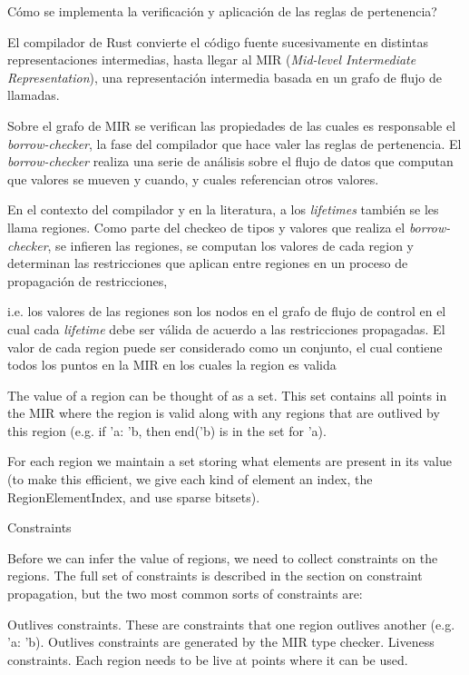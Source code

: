\documentclass[11pt, a4paper]{article}
\begin{document}
Cómo se implementa la verificación y aplicación de las reglas de pertenencia?

El compilador de Rust convierte el código fuente sucesivamente en distintas representaciones intermedias, hasta llegar al MIR (\textit{Mid-level Intermediate Representation}), una representación intermedia basada en un grafo de flujo de llamadas.

Sobre el grafo de MIR se verifican las propiedades de las cuales es responsable el \textit{borrow-checker}, la fase del compilador que hace valer las reglas de pertenencia.
El \textit{borrow-checker} realiza una serie de análisis sobre el flujo de datos que computan que valores se mueven y cuando, y cuales referencian otros valores.

En el contexto del compilador y en la literatura, a los \textit{lifetimes} también se les llama regiones.
Como parte del checkeo de tipos y valores que realiza el \textit{borrow-checker}, se infieren las regiones, se computan los valores de cada region y determinan las restricciones que aplican entre regiones en un proceso de propagación de restricciones,

i.e. los valores de las regiones son los nodos en el grafo de flujo de control en el cual cada \textit{lifetime} debe ser válida de acuerdo a las restricciones propagadas.
El valor de cada region puede ser considerado como un conjunto, el cual contiene todos los puntos en la MIR en los cuales la region es valida


The value of a region can be thought of as a set. This set contains all points in the MIR where the region is valid along with any regions that are outlived by this region (e.g. if 'a: 'b, then end('b) is in the set for 'a).

For each region we maintain a set storing what elements are present in its value (to make this efficient, we give each kind of element an index, the RegionElementIndex, and use sparse bitsets).

Constraints

Before we can infer the value of regions, we need to collect constraints on the regions. The full set of constraints is described in the section on constraint propagation, but the two most common sorts of constraints are:

    Outlives constraints. These are constraints that one region outlives another (e.g. 'a: 'b). Outlives constraints are generated by the MIR type checker.
    Liveness constraints. Each region needs to be live at points where it can be used.
\end{document}
